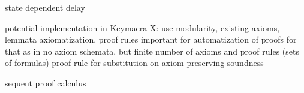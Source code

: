         

    	state dependent delay

        potential implementation in Keymaera X: use modularity, existing axioms, lemmata
        axiomatization, proof rules important for automatization of proofs
        for that as \dL in \cite{Platzer15Uniform} no axiom schemata, but finite number of axioms and proof rules (sets of formulas)
        proof rule for substitution on axiom preserving soundness

        sequent proof calculus

        